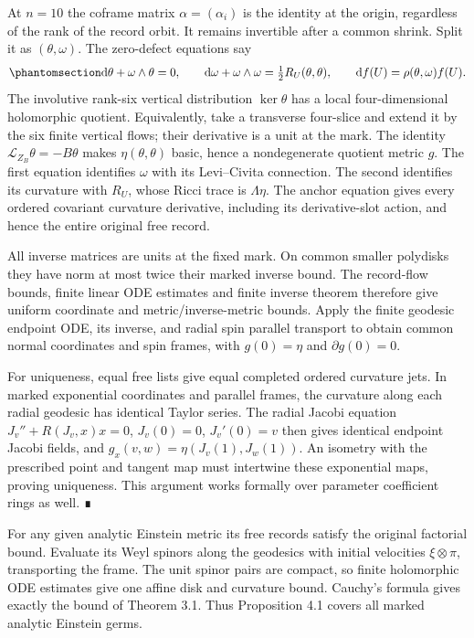 \documentclass[
  english,
  11pt,
  reqno]{amsart}
\begin{document}
At \(n=10\) the coframe matrix \(\alpha=(\alpha_i)\) is the identity at
the origin, regardless of the rank of the record orbit. It remains
invertible after a common shrink. Split it as \((\theta,\omega)\). The
zero-defect equations say
\begin{equation}\protect\phantomsection\label{eq:gg-realized-cartan}{
 \mathrm d\theta+\omega\wedge\theta=0,\qquad
 \mathrm d\omega+\omega\wedge\omega
       =\tfrac12R_U(\theta,\theta),\qquad
 \mathrm df(U)=\rho(\theta,\omega)f(U).
}\end{equation} The involutive rank-six vertical distribution
\(\ker\theta\) has a local four-dimensional holomorphic quotient.
Equivalently, take a transverse four-slice and extend it by the six
finite vertical flows; their derivative is a unit at the mark. The
identity \(\mathcal L_{Z_B}\theta=-B\theta\) makes
\(\eta(\theta,\theta)\) basic, hence a nondegenerate quotient metric
\(g\). The first equation identifies \(\omega\) with its Levi--Civita
connection. The second identifies its curvature with \(R_U\), whose
Ricci trace is \(\Lambda\eta\). The anchor equation gives every ordered
covariant curvature derivative, including its derivative-slot action,
and hence the entire original free record.

All inverse matrices are units at the fixed mark. On common smaller
polydisks they have norm at most twice their marked inverse bound. The
record-flow bounds, finite linear ODE estimates and finite inverse
theorem therefore give uniform coordinate and metric/inverse-metric
bounds. Apply the finite geodesic endpoint ODE, its inverse, and radial
spin parallel transport to obtain common normal coordinates and spin
frames, with \(g(0)=\eta\) and \(\partial g(0)=0\).

For uniqueness, equal free lists give equal completed ordered curvature
jets. In marked exponential coordinates and parallel frames, the
curvature along each radial geodesic has identical Taylor series. The
radial Jacobi equation \(J_v''+R(J_v,x)x=0\), \(J_v(0)=0\),
\(J_v'(0)=v\) then gives identical endpoint Jacobi fields, and
\(g_x(v,w)=\eta(J_v(1),J_w(1))\). An isometry with the prescribed point
and tangent map must intertwine these exponential maps, proving
uniqueness. This argument works formally over parameter coefficient
rings as well. ∎

For any given analytic Einstein metric its free records satisfy the
original factorial bound. Evaluate its Weyl spinors along the geodesics
with initial velocities \(\xi\otimes\pi\), transporting the frame. The
unit spinor pairs are compact, so finite holomorphic ODE estimates give
one affine disk and curvature bound. Cauchy's formula gives exactly the
bound of Theorem 3.1. Thus Proposition 4.1 covers all marked analytic
Einstein germs.
\end{document}
